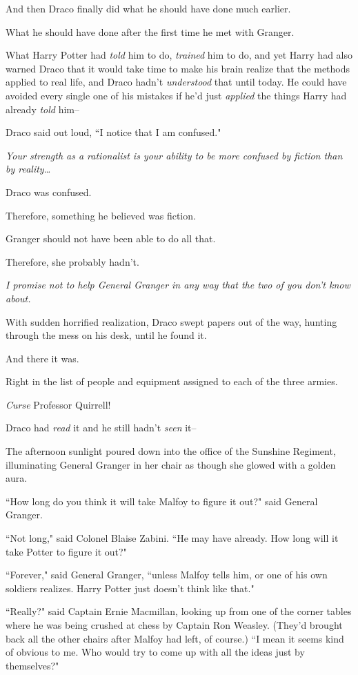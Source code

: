 And then Draco finally did what he should have done much earlier.

What he should have done after the first time he met with Granger.

What Harry Potter had \emph{told} him to do, \emph{trained} him to do, and yet Harry had also warned Draco that it would take time to make his brain realize that the methods applied to real life, and Draco hadn't \emph{understood} that until today. He could have avoided every single one of his mistakes if he'd just \emph{applied} the things Harry had already \emph{told} him\---

Draco said out loud, ``I notice that I am confused."

\emph{Your strength as a rationalist is your ability to be more confused by fiction than by reality{\ldots}}

Draco was confused.

Therefore, something he believed was fiction.

Granger should not have been able to do all that.

Therefore, she probably hadn't.

\emph{I promise not to help General Granger in any way that the two of you don't know about.}

With sudden horrified realization, Draco swept papers out of the way, hunting through the mess on his desk, until he found it.

And there it was.

Right in the list of people and equipment assigned to each of the three armies.

\emph{Curse} Professor Quirrell!

Draco had \emph{read} it and he still hadn't \emph{seen} it\---

\later

The afternoon sunlight poured down into the office of the Sunshine Regiment, illuminating General Granger in her chair as though she glowed with a golden aura.

``How long do you think it will take Malfoy to figure it out?" said General Granger.

``Not long," said Colonel Blaise Zabini. ``He may have already. How long will it take Potter to figure it out?"

``Forever," said General Granger, ``unless Malfoy tells him, or one of his own soldiers realizes. Harry Potter just doesn't think like that."

``Really?" said Captain Ernie Macmillan, looking up from one of the corner tables where he was being crushed at chess by Captain Ron Weasley. (They'd brought back all the other chairs after Malfoy had left, of course.) ``I mean it seems kind of obvious to me. Who would try to come up with all the ideas just by themselves?"

